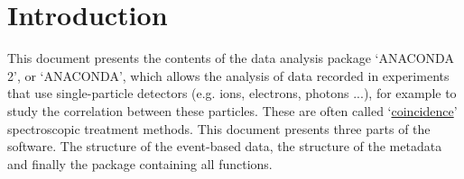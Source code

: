 \section{Introduction}

This document presents the contents of the data analysis package `ANACONDA 2', or `ANACONDA', which allows the analysis of data recorded in experiments that use single-particle detectors (e.g. ions, electrons, photons ...), for example to study the correlation between these particles. These are often called `\href{https://en.wikipedia.org/wiki/Photoelectron_photoion_coincidence_spectroscopy}{coincidence}' spectroscopic treatment methods.
This document presents three parts of the software. The structure of the event-based data, the structure of the metadata and finally the package containing all functions.

